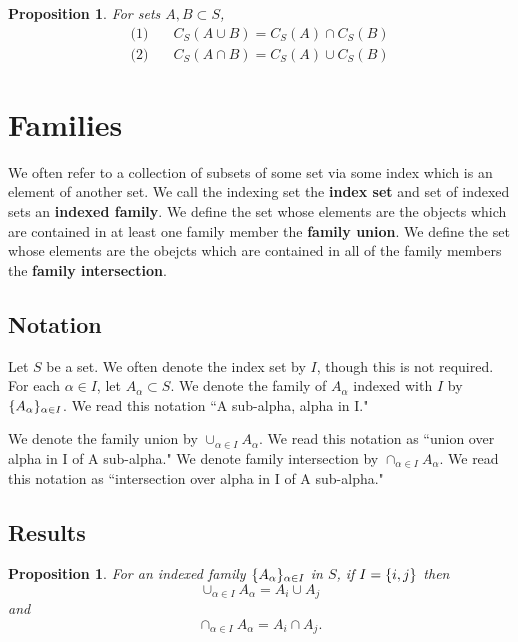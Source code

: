 \documentclass[18pt]{article}
\newcommand{\definition}[1]{\textbf{#1}}
\newcommand{\say}[1]{``#1"}
\DeclarePairedDelimiter{\set}{\{}{\}}
\newcommand{\union}{\cup}
\newcommand{\intersect}{\cap}
\newtheorem{prop}[thm]{Proposition}
\begin{document}
\begin{prop}
  For sets $A, B \subset S$,
  \[
    \begin{aligned}
      \text{(1)} \quad & C_S(A \union B) = C_S(A) \intersect C_S(B) \\
      \text{(2)} \quad & C_S(A \intersect B) = C_S(A) \union C_S(B)
    \end{aligned}
  \]
\end{prop}

\section{Families}

We often refer to a collection of subsets of some set via some index which is an element of another set.
We call the indexing set the \definition{index set} and set of indexed sets an \definition{indexed family}.
We define the set whose elements are the objects which are contained in at least one family member the \definition{family union}.
We define the set whose elements are the obejcts which are contained in all of the family members the \definition{family intersection}.

\subsection{Notation}

Let $S$ be a set.
We often denote the index set by $I$, though this is not required.
For each $\alpha \in I$, let $A_{\alpha} \subset S$.
We denote the family of $A_{\alpha}$ indexed with $I$ by $\set{A_{\alpha}}_{\alpha \in I}$.
We read this notation \say{A sub-alpha, alpha in I.}

We denote the family union by $\union_{\alpha \in I} A_{\alpha}$.
We read this notation as \say{union over alpha in I of A sub-alpha.}
We denote family intersection by $\intersect_{\alpha \in I} A_{\alpha}$.
We read this notation as \say{intersection over alpha in I of A sub-alpha.}

\subsection{Results}

\begin{prop}
  For an indexed family $\set{A_{\alpha}}_{\alpha \in I}$ in $S$, if $I = \set{i, j}$ then
  \[
    \union_{\alpha \in I} A_{\alpha} = A_i \union A_j
  \]
  and
  \[
    \intersect_{\alpha \in I} A_{\alpha} = A_i \intersect A_j.
  \]
\end{prop}
\end{document}
